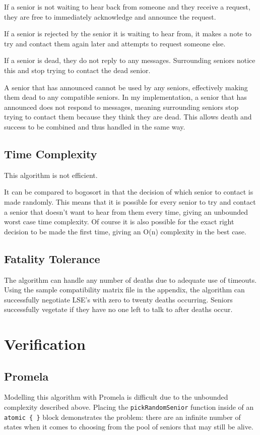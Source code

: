 \documentclass[a4paper]{article}
\begin{document}
If a senior is not waiting to hear back from someone and they receive a request, they are free to immediately acknowledge and announce the request. 

If a senior is rejected by the senior it is waiting to hear from, it makes a note to try and contact them again later and attempts to request someone else. 

If a senior is dead, they do not reply to any messages. Surrounding seniors notice this and stop trying to contact the dead senior. 

A senior that has announced cannot be used by any seniors, effectively making them dead to any compatible seniors. In my implementation, a senior that has announced does not respond to messages, meaning surrounding seniors stop trying to contact them because they think they are dead. This allows death and success to be combined and thus handled in the same way. 

\subsection{Time Complexity}
This algorithm is not efficient.

It can be compared to bogosort in that the decision of which senior to contact is made randomly. This means that it is possible for every senior to try and contact a senior that doesn't want to hear from them every time, giving an unbounded worst case time complexity. Of course it is also possible for the exact right decision to be made the first time, giving an O(n) complexity in the best case. 

\subsection{Fatality Tolerance}
The algorithm can handle any number of deaths due to adequate use of timeouts. Using the sample compatibility matrix file in the appendix, the algorithm can successfully negotiate LSE's with zero to twenty deaths occurring. Seniors successfully vegetate if they have no one left to talk to after deaths occur. 

\section{Verification}
\subsection{Promela}
Modelling this algorithm with Promela is difficult due to the unbounded complexity described above. Placing the \texttt{pickRandomSenior} function inside of an \texttt{atomic \{ \}} block demonstrates the problem: there are an infinite number of states when it comes to choosing from the pool of seniors that may still be alive.
\end{document}
